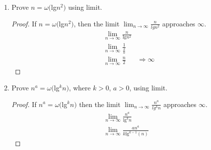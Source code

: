 \documentclass{article}
\begin{document}
\begin{enumerate}
            \item Prove $n=\omega($lg$n^2)$ using limit.
                \begin{proof}
                    If $n=\omega($lg$n^2)$, then the limit $\lim_{n\to\infty}\frac{n}{lgn^2}$ approaches $\infty$.
                    \begin{align*}
                        \lim_{n\to\infty}\frac{n}{\text{lg}n^2}&\\
                        \lim_{n\to\infty}\frac{1}{\frac{2}{n}}&\\
                        \lim_{n\to\infty}\frac{n}{2}& \Rightarrow \infty
                    \end{align*}
                \end{proof}
            \item Prove $n^a=\omega($lg$^kn)$, where $k>0$, $a>0$, using limit.
                \begin{proof}
                    If $n^a=\omega($lg$^kn)$ then the limit $\lim_{n\to\infty}\frac{n^a}{lg^kn}$ approaches $\infty$.
                    \begin{align*}
                        \lim_{n\to\infty}\frac{n^a}{\text{lg}^kn}&\\
                        \lim_{n\to\infty}\frac{an^{a}}{k\text{lg}^{k-1}(n)}&
                    \end{align*}
                \end{proof}
        \end{enumerate}
    
\end{document}

